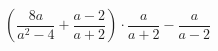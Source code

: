 \begin{ex}[type=expression]
	\begin{condition}
		\( \left( \dfrac{8a}{a^2-4}+\dfrac{a-2}{a+2} \right) \cdot\dfrac{a}{a+2}-\dfrac{a}{a-2}\)
	\end{condition}
\end{ex}